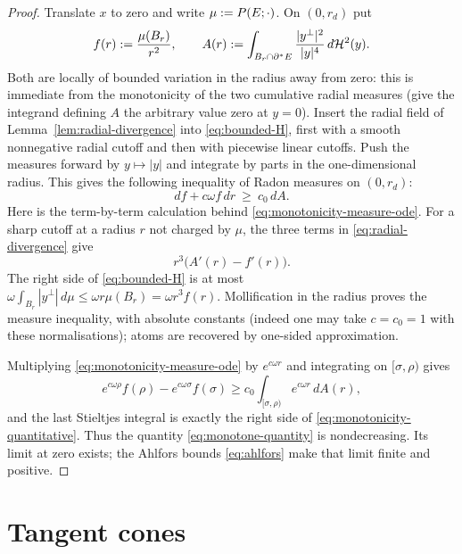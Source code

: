 \begin{proof}
Translate $x$ to zero and write $\mu:=P(E;\cdot)$.  On $(0,r_d)$ put
\[
 f(r):=\frac{\mu(B_r)}{r^2},\qquad
 A(r):=\int_{B_r\cap\partial^* E}\frac{|y^\perp|^2}{|y|^4}\,d\mathcal H^2(y).
\]
Both are locally of bounded variation in the radius away from zero: this is
immediate from the monotonicity of the two cumulative radial measures (give
the integrand defining $A$ the arbitrary value zero at $y=0$).  Insert the radial field of
Lemma~\ref{lem:radial-divergence} into \eqref{eq:bounded-H}, first with a
smooth nonnegative radial cutoff and then with piecewise linear cutoffs.
Push the measures forward by $y\mapsto|y|$ and integrate by parts in the
one-dimensional radius.  This gives the following inequality of Radon
measures on $(0,r_d)$:
\begin{equation}\label{eq:monotonicity-measure-ode}
  df+c\omega f\,dr\ \ge\ c_0\,dA .
\end{equation}
Here is the term-by-term calculation behind \eqref{eq:monotonicity-measure-ode}.
For a sharp cutoff at a radius $r$ not charged by $\mu$, the three terms in
\eqref{eq:radial-divergence} give
\[
 r^3\bigl(A'(r)-f'(r)\bigr).
\]
The right side of \eqref{eq:bounded-H} is at most
$\omega\int_{B_r}|y^\perp|\,d\mu\le\omega r\mu(B_r)
=\omega r^3f(r)$.  Mollification in the radius proves the measure inequality,
with absolute constants (indeed one may take $c=c_0=1$ with these
normalisations); atoms are recovered by one-sided approximation.

Multiplying \eqref{eq:monotonicity-measure-ode} by $e^{c\omega r}$ and
integrating on $[\sigma,\rho)$ gives
\[
 e^{c\omega\rho}f(\rho)-e^{c\omega\sigma}f(\sigma)
 \ge c_0\int_{[\sigma,\rho)}e^{c\omega r}\,dA(r),
\]
and the last Stieltjes integral is exactly the right side of
\eqref{eq:monotonicity-quantitative}.  Thus the quantity
\eqref{eq:monotone-quantity} is nondecreasing.  Its limit at zero exists;
the Ahlfors bounds \eqref{eq:ahlfors} make that limit finite and positive.
\end{proof}

\section{Tangent cones}

